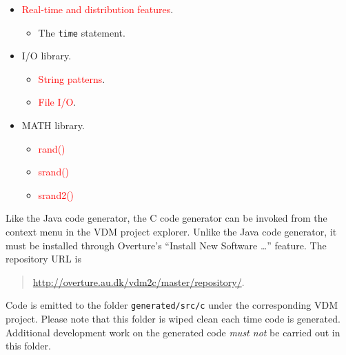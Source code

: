 \begin{itemize}
%
\item  \textcolor{red}{Real-time and distribution features}.
\begin{itemize}
\item  The \verb|time| statement.
\end{itemize}
%
\item  I/O library.
\begin{itemize}
\item  \textcolor{red}{String patterns}.
\item  \textcolor{red}{File I/O}.
\end{itemize}
%
\item MATH library.
\begin{itemize}
\item  \textcolor{red}{rand()}
\item  \textcolor{red}{srand()}
\item  \textcolor{red}{srand2()}
\end{itemize}
%
\end{itemize}

Like the Java code generator, the C code generator can be invoked from the context menu in the VDM project explorer.
%
Unlike the Java code generator, it must be installed through Overture's ``Install New Software \dots'' feature.
%
The repository URL is
%
%
%
\begin{quote}
\url{http://overture.au.dk/vdm2c/master/repository/}.
\end{quote}
%
Code is emitted to the folder \texttt{generated/src/c} under the corresponding VDM project.
%
Please note that this folder is wiped clean each time code is generated.
%
Additional development work on the generated code \emph{must not} be carried out in this folder.
